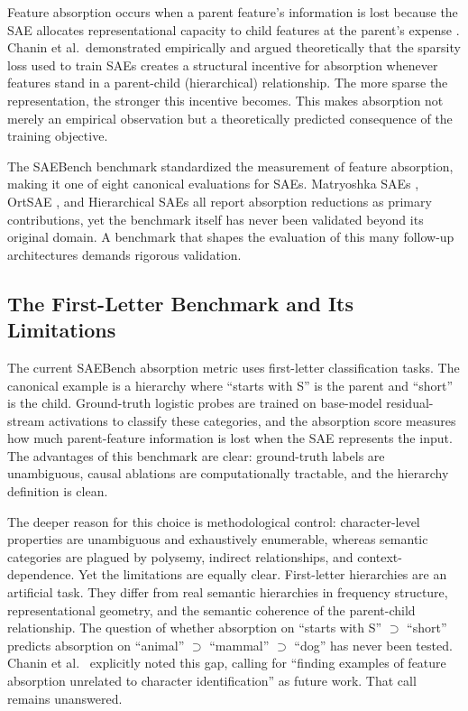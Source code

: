 \documentclass{article}
\begin{document}
Feature absorption occurs when a parent feature's information is lost because the SAE allocates representational capacity to child features at the parent's expense \citep{chanin2024absorption}. Chanin et al.~demonstrated empirically and argued theoretically that the sparsity loss used to train SAEs creates a structural incentive for absorption whenever features stand in a parent-child (hierarchical) relationship. The more sparse the representation, the stronger this incentive becomes. This makes absorption not merely an empirical observation but a theoretically predicted consequence of the training objective.

The SAEBench benchmark \citep{adamkarvonen2025} standardized the measurement of feature absorption, making it one of eight canonical evaluations for SAEs. Matryoshka SAEs \citep{bussmann2025matryoshka}, OrtSAE \citep{korznikov2025ortsae}, and Hierarchical SAEs \citep{zhan2026hierarchical} all report absorption reductions as primary contributions, yet the benchmark itself has never been validated beyond its original domain. A benchmark that shapes the evaluation of this many follow-up architectures demands rigorous validation.

\subsection{The First-Letter Benchmark and Its Limitations}

The current SAEBench absorption metric uses first-letter classification tasks. The canonical example is a hierarchy where ``starts with S'' is the parent and ``short'' is the child. Ground-truth logistic probes are trained on base-model residual-stream activations to classify these categories, and the absorption score measures how much parent-feature information is lost when the SAE represents the input. The advantages of this benchmark are clear: ground-truth labels are unambiguous, causal ablations are computationally tractable, and the hierarchy definition is clean.

The deeper reason for this choice is methodological control: character-level properties are unambiguous and exhaustively enumerable, whereas semantic categories are plagued by polysemy, indirect relationships, and context-dependence. Yet the limitations are equally clear. First-letter hierarchies are an artificial task. They differ from real semantic hierarchies in frequency structure, representational geometry, and the semantic coherence of the parent-child relationship. The question of whether absorption on ``starts with S'' $\supset$ ``short'' predicts absorption on ``animal'' $\supset$ ``mammal'' $\supset$ ``dog'' has never been tested. Chanin et al.~\citep{chanin2024absorption} explicitly noted this gap, calling for ``finding examples of feature absorption unrelated to character identification'' as future work. That call remains unanswered.
\end{document}
